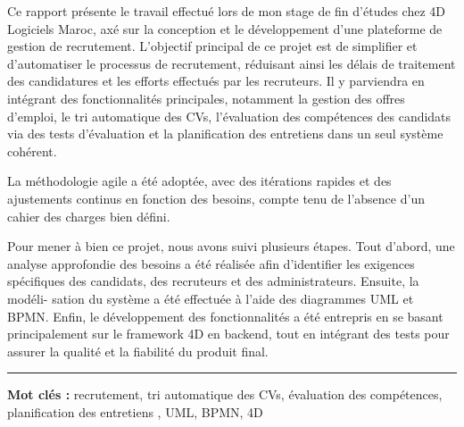 \begin{spacing}{1.25}

Ce rapport présente le travail effectué lors de mon stage de fin d’études 
chez 4D Logiciels Maroc, axé sur la conception et le développement 
d’une plateforme de gestion de recrutement. L'objectif principal 
de ce projet est de simplifier et d'automatiser le processus de recrutement,
réduisant ainsi les délais de traitement des candidatures et les efforts effectués par les recruteurs. 
Il y parviendra en intégrant des fonctionnalités principales, notamment la 
gestion des offres d'emploi, le tri automatique des CVs, l'évaluation des compétences des candidats via des tests d'évaluation 
et la planification des entretiens dans un seul système 
cohérent.
\newline

La méthodologie agile 
a été adoptée, avec des itérations rapides et des ajustements 
continus en fonction des besoins, compte tenu de l'absence 
d'un cahier des charges bien défini. 
\newline

Pour mener à bien ce projet, nous avons suivi plusieurs étapes. 
Tout d’abord, une analyse approfondie des besoins a été réalisée 
afin d'identifier les exigences spécifiques des candidats, 
des recruteurs et des administrateurs. Ensuite, la modéli-
sation 
du système a été effectuée à l’aide des diagrammes UML et BPMN. 
Enfin, le développement des fonctionnalités a été entrepris en se 
basant principalement sur le framework 4D en backend, tout en 
intégrant des tests pour assurer la qualité et la fiabilité du produit final.

\end{spacing}

\vspace{1cm}
\noindent\rule[2pt]{\textwidth}{0.5pt}

{\textbf{Mot clés :} 
recrutement,
tri automatique des CVs,
évaluation des compétences, planification des entretiens
, UML, BPMN, 4D}
\\
